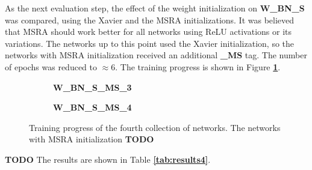 \noindent As the next evaluation step, the effect of the weight initialization on \textbf{W\_BN\_S} was compared, using the Xavier and the MSRA initializations. It was believed that MSRA should work better for all networks using ReLU activations or its variations. The networks up to this point used the Xavier initialization, so the networks with MSRA initialization received an additional \textbf{\_MS} tag. The number of epochs was reduced to $\approx$6. The training progress is shown in Figure \textbf{\ref{fig:weighted_batchnorm_shuffle_msra_training}}.\\

\begin {figure}[!htb]
	\begin {subfigure}[b]{0.4\linewidth}
		\scalebox{0.65}{}
		\caption{\textbf{W\_BN\_S\_MS\_3}}
	\end {subfigure}\hspace{1.75cm}
	\begin {subfigure}[b]{0.4\linewidth}
		\scalebox{0.65}{}
		\caption{\textbf{W\_BN\_S\_MS\_4}}
	\end {subfigure}

		\caption[Training progress of the fourth collection of networks.]{Training progress of the fourth collection of networks. The networks with MSRA initialization \textbf{TODO}}
		\label{fig:weighted_batchnorm_shuffle_msra_training}
\end {figure}


\textbf{TODO} The results are shown in Table \textbf{\ref{tab:results4}}. \\


